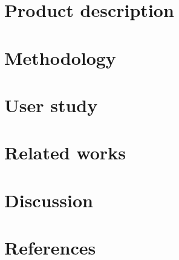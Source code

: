 \documentclass[12pt]{article}
\begin{document}
\clearpage
\section{Product description}



\clearpage


\section{Methodology}



\clearpage

\section{User study}



\clearpage

\section{Related works}



\clearpage

\section{Discussion}



\clearpage


\section{References}

\printbibliography
\end{document}
